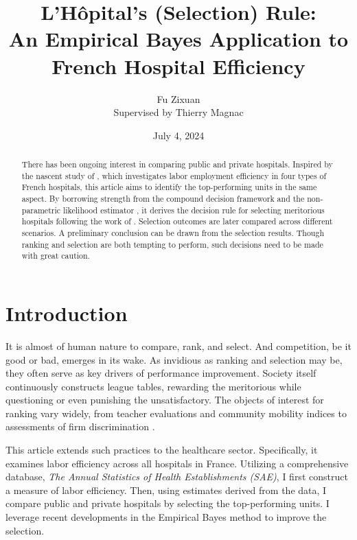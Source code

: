 \documentclass[12pt]{article}
\title{L'Hôpital's (Selection) Rule:\\{\large {An Empirical Bayes Application to French Hospital Efficiency}}}
\author{Fu Zixuan \\{\small {Supervised by Thierry Magnac}}}
\date{July 4, 2024}
\begin{document}
\maketitle
\thispagestyle{empty}
\begin{abstract}
    \noindent  There has been ongoing interest in comparing public and private hospitals. Inspired by the nascent study of \citet{croiset2024hospitals}, which investigates labor employment efficiency in four types of French hospitals, this article aims to identify the top-performing units in the same aspect. By borrowing strength from the compound decision framework and the non-parametric likelihood estimator \citep{kiefer1956consistency}, it derives the decision rule for selecting meritorious hospitals following the work of \citet{gu2023invidious}. Selection outcomes are later compared across different scenarios. A preliminary conclusion can be drawn from the selection results. Though ranking and selection are both tempting to perform, such decisions need to be made with great caution.\\


    \bigskip
\end{abstract}

\newpage
\thispagestyle{empty}
\tableofcontents
\newpage

\setcounter{page}{1}
\section{Introduction}

It is almost of human nature to compare, rank, and select. And competition, be
it good or bad, emerges in its wake. As invidious as ranking and selection may
be, they often serve as key drivers of performance improvement. Society itself
continuously constructs league tables, rewarding the meritorious while
questioning or even punishing the unsatisfactory. The objects of interest for
ranking vary widely, from teacher evaluations \citep{chetty2014measuring} and
community mobility indices \citep{chetty2018impacts} to assessments of firm
discrimination \citep{kline2022systemic}.

This article extends such practices to the healthcare sector. Specifically, it
examines labor efficiency across all hospitals in France. Utilizing a
comprehensive database, \textit{The Annual Statistics of Health Establishments
    (SAE)}, I first construct a measure of labor efficiency. Then, using estimates
derived from the data, I compare public and private hospitals by selecting the
top-performing units. I leverage recent developments in the Empirical Bayes
method to improve the selection.
\end{document}
